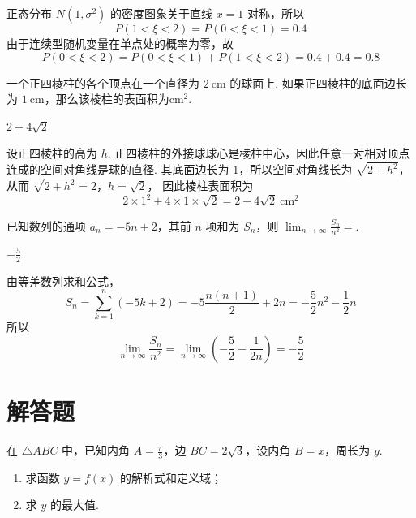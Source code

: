\begin{solution}
正态分布 \(N(1,\sigma^2)\) 的密度图象关于直线 \(x=1\) 对称，所以
\[
P(1<\xi<2)=P(0<\xi<1)=0.4
\]
由于连续型随机变量在单点处的概率为零，故
\[
P(0<\xi<2)=P(0<\xi<1)+P(1<\xi<2)=0.4+0.4=0.8
\]
\end{solution}

\begin{problem}
一个正四棱柱的各个顶点在一个直径为 \(2 \mathrm{~cm}\) 的球面上. 如果正四棱柱的底面边长为 \(1 \mathrm{~cm}\)，那么该棱柱的表面积为\fillinblank{}\(\mathrm{cm}^{2}\).
\end{problem}

\begin{answer}
\(2 + 4\sqrt{2}\)
\end{answer}

\begin{solution}
设正四棱柱的高为 \(h\). 正四棱柱的外接球球心是棱柱中心，因此任意一对相对顶点连成的空间对角线是球的直径. 其底面边长为 \(1\)，所以空间对角线长为 \(\sqrt{2+h^2}\)，从而
\(\sqrt{2+h^2}=2\)，\(h=\sqrt2\)，
因此棱柱表面积为
\[
2\times1^2+4\times1\times\sqrt2=2+4\sqrt2\ \mathrm{cm}^2
\]
\end{solution}

\begin{problem}
已知数列的通项 \(a_{n} = -5n + 2\)，其前 \(n\) 项和为 \(S_{n}\)，则 \(\displaystyle\lim_{n\to\infty}\frac{S_n}{n^2} = \)\fillinblank{}.
\end{problem}

\begin{answer}
\(-\frac{5}{2}\)
\end{answer}

\begin{solution}
由等差数列求和公式，
\[
S_n=\sum_{k=1}^n(-5k+2)=-5\frac{n(n+1)}{2}+2n=-\frac52n^2-\frac12n
\]
所以
\[
\lim_{n\to\infty}\frac{S_n}{n^2}
=\lim_{n\to\infty}\left(-\frac52-\frac{1}{2n}\right)=-\frac52
\]
\end{solution}

\section{解答题}
\begin{problem}
在 \(\triangle ABC\) 中，已知内角 \(A = \frac{\pi}{3}\)，边 \(BC = 2\sqrt{3}\)，设内角 \(B = x\)，周长为 \(y\).
\begin{enumerate}
\item 求函数 \( y = f(x) \) 的解析式和定义域；
\item 求 \(y\) 的最大值.
\end{enumerate}
\end{problem}

